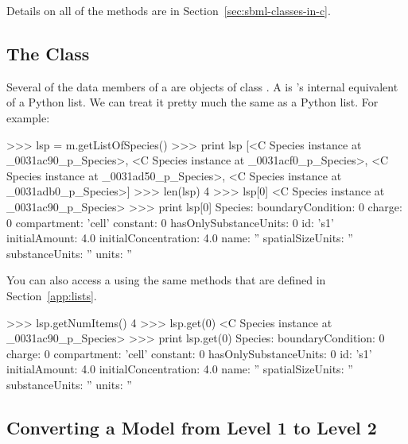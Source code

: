 \documentclass{sbmlmanual}
\begin{document}
Details on all of the methods are in Section~\ref{sec:sbml-classes-in-c}.

\subsection{The  Class}
\label{sec:python-listof}

Several of the data members of a  are objects of class
.  A  is \libsbml{}'s internal equivalent of a
Python list.  We can treat it pretty much the same as a
Python list.  For example:

\begin{shellVerbatim}
>>> lsp = m.getListOfSpecies()
>>> print lsp
[<C Species instance at _0031ac90_p_Species>, <C Species instance at _0031acf0_p_Species>, <C Species instance at _0031ad50_p_Species>, <C Species instance at _0031adb0_p_Species>]
>>> len(lsp)
4
>>> lsp[0]
<C Species instance at _0031ac90_p_Species>
>>> print lsp[0]
Species:
   boundaryCondition:      0
   charge:                 0
   compartment:            'cell'
   constant:               0
   hasOnlySubstanceUnits:  0
   id:                     's1'
   initialAmount:          4.0
   initialConcentration:   4.0
   name:                   ''
   spatialSizeUnits:       ''
   substanceUnits:         ''
   units:                  ''
\end{shellVerbatim}
         
You can also access a  using the same methods that are
defined in Section~\ref{app:lists}.

\begin{shellVerbatim}
>>> lsp.getNumItems()
4
>>> lsp.get(0)
<C Species instance at _0031ac90_p_Species>
>>> print lsp.get(0)
Species:
   boundaryCondition:      0
   charge:                 0
   compartment:            'cell'
   constant:               0
   hasOnlySubstanceUnits:  0
   id:                     's1'
   initialAmount:          4.0
   initialConcentration:   4.0
   name:                   ''
   spatialSizeUnits:       ''
   substanceUnits:         ''
   units:                  ''
\end{shellVerbatim}


\subsection{Converting a Model from Level 1 to Level 2}
\label{sec:python-converting}
\end{document}
